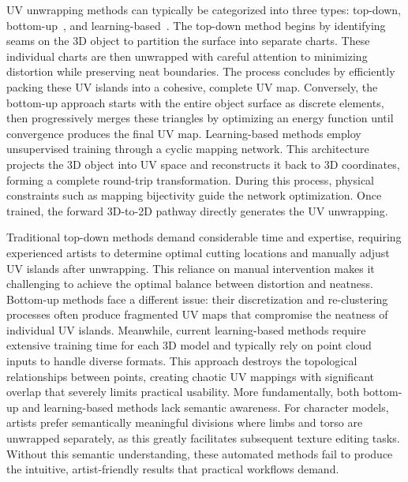 \documentclass{article}
\begin{document}
UV unwrapping methods can typically be categorized into three types: top-down, bottom-up~\cite{sorkine2002bounded, li2018optcuts}, and learning-based~\cite{srinivasan2024nuvo,zhang2024flatten}. The top-down method begins by identifying seams on the 3D object to partition the surface into separate charts. These individual charts are then unwrapped with careful attention to minimizing distortion while preserving neat boundaries. The process concludes by efficiently packing these UV islands into a cohesive, complete UV map. Conversely, the bottom-up approach starts with the entire object surface as discrete elements, then progressively merges these triangles by optimizing an energy function until convergence produces the final UV map. Learning-based methods employ unsupervised training through a cyclic mapping network. This architecture projects the 3D object into UV space and reconstructs it back to 3D coordinates, forming a complete round-trip transformation. During this process, physical constraints such as mapping bijectivity guide the network optimization. Once trained, the forward 3D-to-2D pathway directly generates the UV unwrapping.

Traditional top-down methods demand considerable time and expertise, requiring experienced artists to determine optimal cutting locations and manually adjust UV islands after unwrapping. This reliance on manual intervention makes it challenging to achieve the optimal balance between distortion and neatness. Bottom-up methods face a different issue: their discretization and re-clustering processes often produce fragmented UV maps that compromise the neatness of individual UV islands. Meanwhile, current learning-based methods require extensive training time for each 3D model and typically rely on point cloud inputs to handle diverse formats. This approach destroys the topological relationships between points, creating chaotic UV mappings with significant overlap that severely limits practical usability. More fundamentally, both bottom-up and learning-based methods lack semantic awareness. For character models, artists prefer semantically meaningful divisions where limbs and torso are unwrapped separately, as this greatly facilitates subsequent texture editing tasks. Without this semantic understanding, these automated methods fail to produce the intuitive, artist-friendly results that practical workflows demand.
\end{document}
